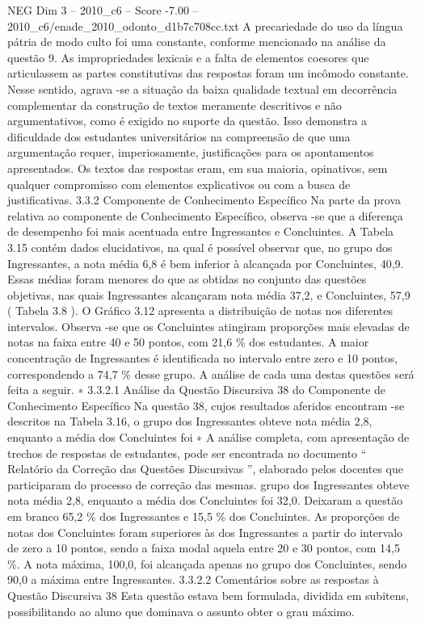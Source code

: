 \begin{textsample}{NEG Dim 3 – 2010\_c6 – Score -7.00 – 2010\_c6/enade\_2010\_odonto\_d1b7c708cc.txt}
A precariedade do uso da língua pátria de modo culto foi uma constante, conforme mencionado na análise da questão 9.
As impropriedades lexicais e a falta de elementos coesores que articulassem as partes constitutivas das respostas foram um incômodo constante.
Nesse sentido, agrava -se a situação da baixa qualidade textual em decorrência complementar da construção de textos meramente descritivos e não argumentativos, como é exigido no suporte da questão.
Isso demonstra a dificuldade dos estudantes universitários na compreensão de que uma argumentação requer, imperiosamente, justificações para os apontamentos apresentados.
Os textos das respostas eram, em sua maioria, opinativos, sem qualquer compromisso com elementos explicativos ou com a busca de justificativas. 3.3.2 Componente de Conhecimento Específico Na parte da prova relativa ao componente de Conhecimento Específico, observa -se que a diferença de desempenho foi mais acentuada entre Ingressantes e Concluintes.
A Tabela 3.15 contém dados elucidativos, na qual é possível observar que, no grupo dos Ingressantes, a nota média 6,8 é bem inferior à alcançada por Concluintes, 40,9.
Essas médias foram menores do que as obtidas no conjunto das questões objetivas, nas quais Ingressantes alcançaram nota média 37,2, e Concluintes, 57,9 ( Tabela 3.8 ).
O Gráfico 3.12 apresenta a distribuição de notas nos diferentes intervalos.
Observa -se que os Concluintes atingiram proporções mais elevadas de notas na faixa entre 40 e 50 pontos, com 21,6 \% dos estudantes.
A maior concentração de Ingressantes é identificada no intervalo entre zero e 10 pontos, correspondendo a 74,7 \% desse grupo.
A análise de cada uma destas questões será feita a seguir. ∗ 3.3.2.1 Análise da Questão Discursiva 38 do Componente de Conhecimento Específico Na questão 38, cujos resultados aferidos encontram -se descritos na Tabela 3.16, o grupo dos Ingressantes obteve nota média 2,8, enquanto a média dos Concluintes foi ∗ A análise completa, com apresentação de trechos de respostas de estudantes, pode ser encontrada no documento “ Relatório da Correção das Questões Discursivas ”, elaborado pelos docentes que participaram do processo de correção das mesmas. grupo dos Ingressantes obteve nota média 2,8, enquanto a média dos Concluintes foi 32,0.
Deixaram a questão em branco 65,2 \% dos Ingressantes e 15,5 \% dos Concluintes.
As proporções de notas dos Concluintes foram superiores às dos Ingressantes a partir do intervalo de zero a 10 pontos, sendo a faixa modal aquela entre 20 e 30 pontos, com 14,5 \%.
A nota máxima, 100,0, foi alcançada apenas no grupo dos Concluintes, sendo 90,0 a máxima entre Ingressantes. 3.3.2.2 Comentários sobre as respostas à Questão Discursiva 38 Esta questão estava bem formulada, dividida em subitens, possibilitando ao aluno que dominava o assunto obter o grau máximo.

\end{textsample}
